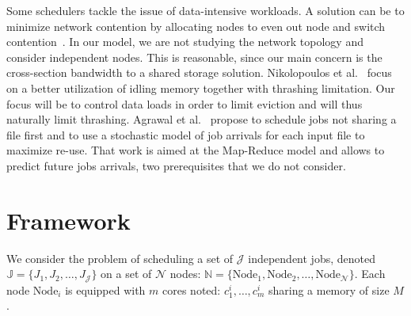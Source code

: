 \documentclass[conference]{IEEEtran}
\newcommand{\Node}[1]{\ensuremath{\mathrm{Node}_{#1}}\xspace}
\newcommand{\memory}{\ensuremath{\mathit{M}}\xspace}
\newcommand{\jobset}{\ensuremath{\mathbb{J}}\xspace}
\newcommand{\jobnum}{\ensuremath{\mathcal{J}}\xspace}
\newcommand{\nodeset}{\ensuremath{\mathbb{N}}\xspace}
\newcommand{\nodenum}{\ensuremath{\mathcal{N}}\xspace}
\begin{document}
Some schedulers tackle the issue of data-intensive workloads. 
A solution can be to minimize network contention by allocating nodes to even out node and
switch contention~\cite{minimize_network_contention}. 
In our model, we are not studying the network topology and consider independent nodes.
This is reasonable, since our main concern is the cross-section bandwidth to a shared storage solution.
%
Nikolopoulos et al.~\cite{Nikolopoulos2003AdaptiveSU}
focus on a better utilization of idling memory together with 
thrashing limitation.
Our focus will be to control data loads in order to limit eviction
and will thus naturally limit thrashing. 
%
Agrawal et al.~\cite{Scheduling_Shared_Scans_of_Large_Data_Files}
propose to schedule jobs not sharing a file first
and to use a stochastic model of job arrivals for each input file to maximize re-use.
That work is aimed at the Map-Reduce model and allows to predict future jobs arrivals, two prerequisites that we do not consider. 
%
%


\section{Framework}\label{sec.framework}

We consider the problem of scheduling a set of $\jobnum$ independent jobs,
denoted $\jobset = \{J_1, J_2, \ldots, J_\jobnum\}$ on a set of
$\nodenum$ nodes:
$\nodeset = \{\Node{1}, \Node{2}, \ldots, \Node{\nodenum}\}$.
Each node $\Node{i}$ is equipped with $m$ cores noted:
$c^i_1,\ldots,c^i_m$ sharing a memory of size $\memory$.
\end{document}
